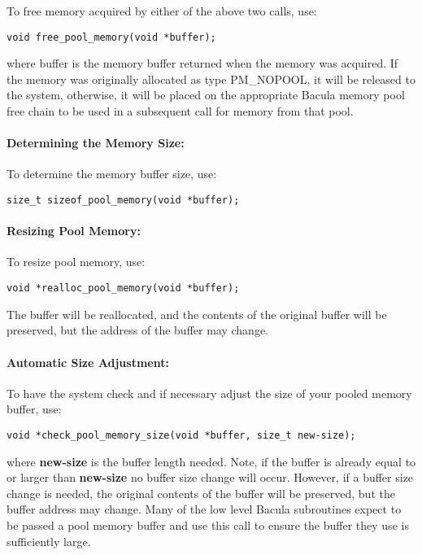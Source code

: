 To free memory acquired by either of the above two calls, use: 

\footnotesize
\begin{verbatim}
void free_pool_memory(void *buffer);
\end{verbatim}
\normalsize

where buffer is the memory buffer returned when the memory was acquired. If
the memory was originally allocated as type PM\_NOPOOL, it will be released to
the system, otherwise, it will be placed on the appropriate Bacula memory pool
free chain to be used in a subsequent call for memory from that pool. 

\paragraph*{Determining the Memory Size:}

To determine the memory buffer size, use: 

\footnotesize
\begin{verbatim}
size_t sizeof_pool_memory(void *buffer);
\end{verbatim}
\normalsize

\paragraph*{Resizing Pool Memory:}

To resize pool memory, use: 

\footnotesize
\begin{verbatim}
void *realloc_pool_memory(void *buffer);
\end{verbatim}
\normalsize

The buffer will be reallocated, and the contents of the original buffer will
be preserved, but the address of the buffer may change. 

\paragraph*{Automatic Size Adjustment:}

To have the system check and if necessary adjust the size of your pooled
memory buffer, use: 

\footnotesize
\begin{verbatim}
void *check_pool_memory_size(void *buffer, size_t new-size);
\end{verbatim}
\normalsize

where {\bf new-size} is the buffer length needed. Note, if the buffer is
already equal to or larger than {\bf new-size} no buffer size change will
occur. However, if a buffer size change is needed, the original contents of
the buffer will be preserved, but the buffer address may change. Many of the
low level Bacula subroutines expect to be passed a pool memory buffer and use
this call to ensure the buffer they use is sufficiently large. 

